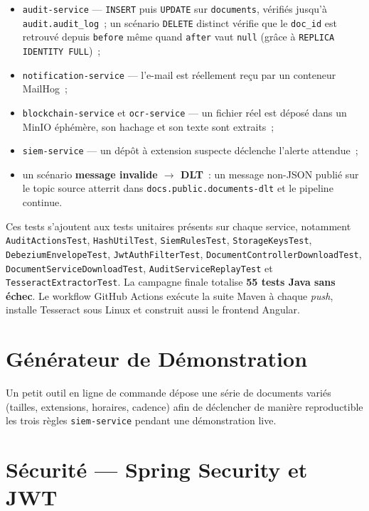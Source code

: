 \documentclass[12pt,a4paper,openany]{report}
\begin{document}
    \begin{itemize}[leftmargin=1.5em]
      \item \texttt{audit-service} --- \texttt{INSERT} puis \texttt{UPDATE} sur \texttt{documents}, v\'erifi\'es jusqu'\`a \texttt{audit.audit\_log}~; un sc\'enario \texttt{DELETE} distinct v\'erifie que le \texttt{doc\_id} est retrouv\'e depuis \texttt{before} m\^eme quand \texttt{after} vaut \texttt{null} (gr\^ace \`a \texttt{REPLICA IDENTITY FULL})~;
      \item \texttt{notification-service} --- l'e-mail est r\'eellement re\c{c}u par un conteneur MailHog~;
      \item \texttt{blockchain-service} et \texttt{ocr-service} --- un fichier r\'eel est d\'epos\'e dans un MinIO \'eph\'em\`ere, son hachage et son texte sont extraits~;
      \item \texttt{siem-service} --- un d\'ep\^ot \`a extension suspecte d\'eclenche l'alerte attendue~;
      \item un sc\'enario \textbf{message invalide $\rightarrow$ DLT}~: un message non-JSON publi\'e sur le topic source atterrit dans \texttt{docs.public.documents-dlt} et le pipeline continue.
    \end{itemize}

    Ces tests s'ajoutent aux tests unitaires pr\'esents sur chaque service, notamment \texttt{AuditActionsTest}, \texttt{HashUtilTest}, \texttt{SiemRulesTest}, \texttt{StorageKeysTest}, \texttt{DebeziumEnvelopeTest}, \texttt{JwtAuthFilterTest}, \texttt{DocumentControllerDownloadTest}, \texttt{DocumentServiceDownloadTest}, \texttt{AuditServiceReplayTest} et \texttt{TesseractExtractorTest}. La campagne finale totalise \textbf{55 tests Java sans \'echec}. Le workflow GitHub Actions ex\'ecute la suite Maven \`a chaque \emph{push}, installe Tesseract sous Linux et construit aussi le frontend Angular.

    \section{G\'en\'erateur de D\'emonstration}

    Un petit outil en ligne de commande d\'epose une s\'erie de documents vari\'es (tailles, extensions, horaires, cadence) afin de d\'eclencher de mani\`ere reproductible les trois r\`egles \texttt{siem-service} pendant une d\'emonstration live.

    \section{S\'ecurit\'e --- Spring Security et JWT}
    \label{sec:securite-jwt}
\end{document}

